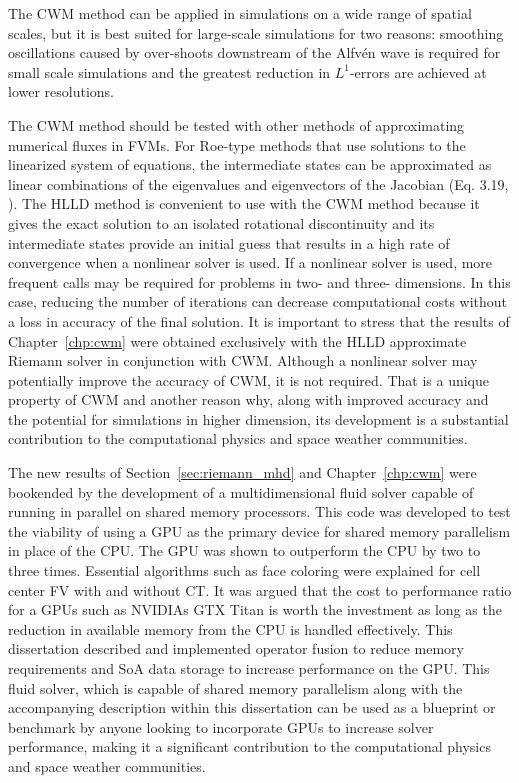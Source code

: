 The CWM method can be applied in simulations on a wide range of spatial scales, but it is best suited for large-scale simulations for two reasons: smoothing oscillations caused by over-shoots downstream of the Alfv{\'e}n wave is required for small scale simulations and the greatest reduction in $L^1$-errors are achieved at lower resolutions.    
  
The CWM method should be tested with other methods of approximating numerical fluxes in FVMs.  For Roe-type methods that use solutions to the linearized system of equations, the intermediate states can be approximated as linear combinations of the eigenvalues and eigenvectors of the Jacobian (Eq. 3.19, \citep{Ryu:1995a}).  The HLLD method is convenient to use with the CWM method because it gives the exact solution to an isolated rotational discontinuity \citep{Miyoshi:2005} and its intermediate states provide an initial guess that results in a high rate of convergence when a nonlinear solver is used.  If a nonlinear solver is used, more frequent calls may be required for problems in two- and three- dimensions.  In this case, reducing the number of iterations can decrease computational costs without a loss in accuracy of the final solution.  It is important to stress that the results of Chapter~\ref{chp:cwm} were obtained exclusively with the HLLD approximate Riemann solver in conjunction with CWM.  Although a nonlinear solver may potentially improve the accuracy of CWM, it is not required.  That is a unique property of CWM and another reason why, along with improved accuracy and the potential for simulations in higher dimension, its development is a substantial contribution to the computational physics and space weather communities.
 
The new results of Section~\ref{sec:riemann_mhd} and Chapter~\ref{chp:cwm} were bookended by the development of a multidimensional fluid solver capable of running in parallel on shared memory processors.  This code was developed to test the viability of using a GPU as the primary device for shared memory parallelism in place of the CPU.  The GPU was shown to outperform the CPU by two to three times.  Essential algorithms such as face coloring were explained for cell center FV with and without CT.  It was argued that the cost to performance ratio for a GPUs such as NVIDIAs GTX Titan is worth the investment as long as the reduction in available memory from the CPU is handled effectively.  This dissertation described and implemented operator fusion to reduce memory requirements and SoA data storage to increase performance on the GPU.  This fluid solver, which is capable of shared memory parallelism along with the accompanying description within this dissertation can be used as a blueprint or benchmark by anyone looking to incorporate GPUs to increase solver performance, making it a significant contribution to the computational physics and space weather communities. 

